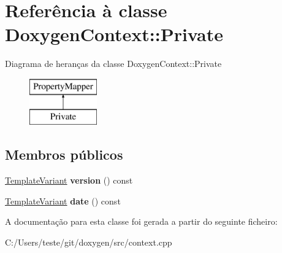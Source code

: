 \hypertarget{class_doxygen_context_1_1_private}{\section{Referência à classe Doxygen\-Context\-:\-:Private}
\label{class_doxygen_context_1_1_private}
}
Diagrama de heranças da classe Doxygen\-Context\-:\-:Private\begin{figure}[H]
\begin{center}
\leavevmode
\includegraphics[height=2.000000cm]{class_doxygen_context_1_1_private}
\end{center}
\end{figure}
\subsection*{Membros públicos}
\begin{DoxyCompactItemize}
\item 
\hypertarget{class_doxygen_context_1_1_private_a031a7603087217423c1b87c859c8f82a}{\hyperlink{class_template_variant}{Template\-Variant} {\bfseries version} () const }\label{class_doxygen_context_1_1_private_a031a7603087217423c1b87c859c8f82a}

\item 
\hypertarget{class_doxygen_context_1_1_private_a783886da39809a8ff8e8de589bfdf386}{\hyperlink{class_template_variant}{Template\-Variant} {\bfseries date} () const }\label{class_doxygen_context_1_1_private_a783886da39809a8ff8e8de589bfdf386}

\end{DoxyCompactItemize}


A documentação para esta classe foi gerada a partir do seguinte ficheiro\-:\begin{DoxyCompactItemize}
\item 
C\-:/\-Users/teste/git/doxygen/src/context.\-cpp\end{DoxyCompactItemize}
